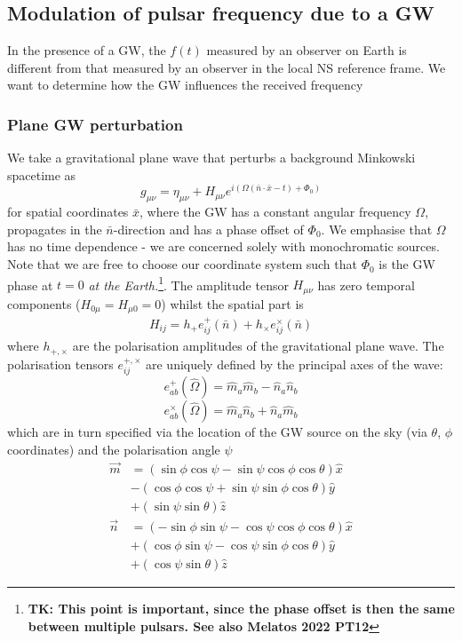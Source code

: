 \documentclass[fleqn,usenatbib,useAMS]{mnras}
\begin{document}
\subsection{Modulation of pulsar frequency due to a GW}
In the presence of a GW, the $f(t)$ measured by an observer on Earth is different from that measured by an observer in the local NS reference frame. We want to determine how the GW influences the received frequency

\subsubsection{Plane GW perturbation}
We take a gravitational plane wave that perturbs a background Minkowski spacetime as
\begin{equation}
	g_{\mu \nu} = \eta_{\mu \nu} + H_{\mu \nu} e^{i(\Omega(\bar{n} \cdot \bar{x} - t) + \Phi_0)	}
\end{equation}
for spatial coordinates $\bar{x}$, where the GW has a constant angular frequency $\Omega$, propagates in the $\bar{n}$-direction and has a phase offset of  $\Phi_0$. We emphasise that $\Omega$ has no time dependence - we are concerned solely with monochromatic sources. Note that we are free to choose our coordinate system such that $\Phi_0$ is the GW phase at $t=0$ \textit{at the Earth.}\footnote{\textbf{TK: This point is important, since the phase offset is then the same between multiple pulsars. See also Melatos 2022 PT12}}. The amplitude tensor $H_{\mu \nu}$ has zero temporal components ($H_{0 \mu} = H_{\mu 0} = 0$) whilst the spatial part is
\begin{align}
	H_{ij} = h_+ e_{ij}^+(\bar{n}) + h_{\times} e_{ij}^{\times}(\bar{n})
\end{align}
where  $h_{+,\times}$ are the polarisation amplitudes of the gravitational plane wave. The polarisation tensors $e_{ij}^{+,\times}$ are uniquely defined by the principal axes of the wave:
\begin{equation}
	e_{a b}^{+}(\hat{\Omega}) =\hat{m}_a \hat{m}_b-\hat{n}_a \hat{n}_b
\end{equation}
\begin{equation}
		e_{a b}^{\times}(\hat{\Omega}) =\hat{m}_a \hat{n}_b+\hat{n}_a \hat{m}_b
\end{equation}
which are in turn specified via the location of the GW source on the sky (via $\theta$, $\phi$ coordinates) and the polarisation angle $\psi$
\begin{align}
	\vec{m} & =(\sin \phi \cos \psi-\sin \psi \cos \phi \cos \theta) \hat{x} \nonumber \\
	& -(\cos \phi \cos \psi+\sin \psi \sin \phi \cos \theta) \hat{y} \nonumber \\
	& +(\sin \psi \sin \theta) \hat{z} \\
	\vec{n} & =(-\sin \phi \sin \psi-\cos \psi \cos \phi \cos \theta) \hat{x} \nonumber \\
	& +(\cos \phi \sin \psi-\cos \psi \sin \phi \cos \theta) \hat{y}\nonumber  \\
	& +(\cos \psi \sin \theta) \hat{z}
\end{align}
\end{document}
